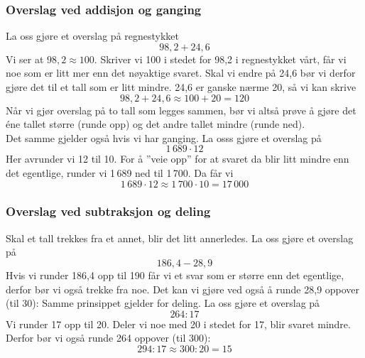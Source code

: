 \subsubsection{Overslag ved addisjon og ganging}
La oss gjøre et overslag på regnestykket
\[ 98,2+24,6 \]
Vi ser at $ 98,2 \approx 100 $. Skriver vi 100 i stedet for 98,2 i regnestykket vårt, får vi noe som er litt mer enn det nøyaktige svaret. Skal vi endre på 24,6 bør vi derfor gjøre det til et tall som er litt mindre. 24,6 er ganske nærme 20, så vi kan skrive
\[ 98,2+24,6 \approx 100 + 20 = 120 \]
Når vi gjør overslag på to tall som legges sammen, bør vi altså prøve å gjøre det éne tallet større (runde opp) og det andre tallet mindre (runde ned).\\
\newpage
\linje
Det samme gjelder også hvis vi har ganging. La osss gjøre et overslag på
\[ 1\,689\cdot12 \]
Her avrunder vi 12 til 10. For å ''veie opp'' for at svaret da blir litt mindre enn det egentlige, runder vi 1\,689 ned til 1\,700. Da får vi
\[ 1\,689\cdot12\approx 1\,700\cdot 10 =17\,000 \]
\subsubsection{Overslag ved subtraksjon og deling}
Skal et tall trekkes fra et annet, blir det litt annerledes. La oss gjøre et overslag på
\[ 186,4-28,9 \]
Hvis vi runder 186,4 opp til 190 får vi et svar som er større enn det egentlige, derfor bør vi også trekke fra noe. Det kan vi gjøre ved også å runde 28,9 oppover (til 30):
\linje
Samme prinsippet gjelder for deling. La oss gjøre et overslag på
\[ 264:17 \]
Vi runder 17 opp til 20. Deler vi noe med 20 i stedet for 17, blir svaret mindre. Derfor bør vi også runde 264 oppover (til 300):
\[ 294:17 \approx 300:20 = 15 \]

\newpage

